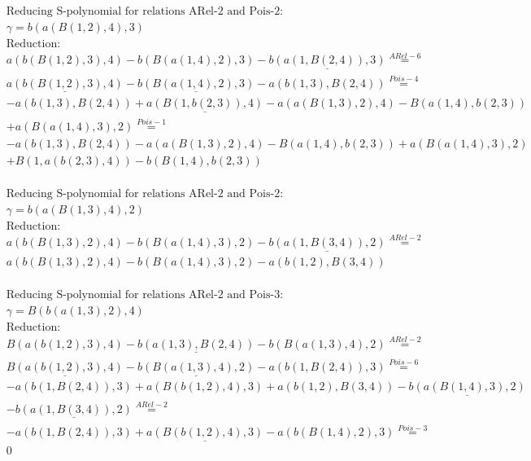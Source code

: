 \documentclass[11pt]{amsart}
\begin{document}
\begin{align*} 
& \text{Reducing S-polynomial for relations ARel-2 and Pois-2:} \\ 
& \gamma = b(a(B(1,2),4),3) \\ 
& \text{Reduction}: \\&a(b(B(1,2),3),4) - b(B(a(1,4),2),3) - \underline{b(a(1,B(2,4)),3)} \stackrel{ ARel-6 }{=}  \\ 
&\underline{a(b(B(1,2),3),4)} - \underline{b(B(a(1,4),2),3)} - a(b(1,3),B(2,4)) \stackrel{ Pois-4 }{=}  \\ 
& - a(b(1,3),B(2,4)) + \underline{a(B(1,b(2,3)),4)} - a(a(B(1,3),2),4) - B(a(1,4),b(2,3))\\ 
 &  + a(B(a(1,4),3),2) \stackrel{ Pois-1 }{=}  \\ 
& - a(b(1,3),B(2,4)) - a(a(B(1,3),2),4) - B(a(1,4),b(2,3)) + a(B(a(1,4),3),2)\\ 
 &  + B(1,a(b(2,3),4)) - b(B(1,4),b(2,3))\\ 
\end{align*} 
 
\begin{align*} 
& \text{Reducing S-polynomial for relations ARel-2 and Pois-2:} \\ 
& \gamma = b(a(B(1,3),4),2) \\ 
& \text{Reduction}: \\&a(b(B(1,3),2),4) - b(B(a(1,4),3),2) - \underline{b(a(1,B(3,4)),2)} \stackrel{ ARel-2 }{=}  \\ 
&a(b(B(1,3),2),4) - b(B(a(1,4),3),2) - a(b(1,2),B(3,4))\\ 
\end{align*} 
 
\begin{align*} 
& \text{Reducing S-polynomial for relations ARel-2 and Pois-3:} \\ 
& \gamma = B(b(a(1,3),2),4) \\ 
& \text{Reduction}: \\&B(a(b(1,2),3),4) - \underline{b(a(1,3),B(2,4))} - b(B(a(1,3),4),2) \stackrel{ ARel-2 }{=}  \\ 
&\underline{B(a(b(1,2),3),4)} - \underline{b(B(a(1,3),4),2)} - a(b(1,B(2,4)),3) \stackrel{ Pois-6 }{=}  \\ 
& - a(b(1,B(2,4)),3) + a(B(b(1,2),4),3) + a(b(1,2),B(3,4)) - \underline{b(a(B(1,4),3),2)}\\ 
 &  - \underline{b(a(1,B(3,4)),2)} \stackrel{ ARel-2 }{=}  \\ 
& - a(b(1,B(2,4)),3) + \underline{a(B(b(1,2),4),3)} - a(b(B(1,4),2),3) \stackrel{ Pois-3 }{=}  \\ 
&0\\ 
\end{align*} 
 
\end{document}
